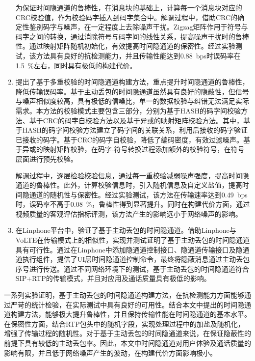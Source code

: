 \begin{conclusion}
\begin{enumerate}
    为保证时间隐通道的鲁棒性，在消息块的基础上，计算每一个消息块对应的CRC校验值，作为校验码字插入到码字集合中。解调过程中，借助CRC的确定性鉴别码字与噪声，在一定程度上去除噪声干扰。Zigzag矩阵作用于符号与码字之间的转换，通过消除符号与码字间的线性关系，提高噪声干扰时的鲁棒性。通过映射矩阵随机初始化，有效提高时间隐通道的保密性。经过实验测试，该方法具有良好的抗检测能力，并且传输性能达到{0.88\ bps}时误码率在{1.5\ \%}左右，同时具有极低的构建代价。
    
    \item
    提出了基于多重校验的时间隐通道构建方法，重点提升时间隐通道的鲁棒性，降低传输误码率。基于主动丢包的时间隐通道虽然具有良好的隐蔽性，但信号与噪声相似度较高，具有极低的信噪比，单一的数据校验与纠错无法满足实际需求。本方法的校验模式主要包含三部分，分别为基于HASH的码字间校验方法、基于CRC的码字自校验方法以及基于异或的映射矩阵校验方法。其中，基于HASH的码字间校验方法建立了码字间的关联关系，利用后接收的码字验证已接收的码字。基于CRC的码字自校验，降低了编码密度，有效过滤噪声。基于异或的映射矩阵校验，在码字-符号转换过程添加额外的校验符号，在符号层面进行预先校验。
    
    解调过程中，逐层检验校验信息，通过每一重校验减弱噪声强度，提高时间隐通道的鲁棒性。此外，计算校验信息时，引入随机信息及自定义盐值，提高时间隐通道的随机性与保密性。经过实验测试，该方法在传输速率达到{0.49\ bps}时，误码率不高于{0.08\ \%}，鲁棒性得到显著提升。同时在构建代价方面，通过视频质量的客观评估指标评测，该方法产生的影响远小于网络噪声的影响。

    \item
    在Linphone平台中，验证了基于主动丢包的时间隐通道。借助Linphone与VoLTE在传输模式上的相似性，实现并测试证明了基于主动丢包的时间隐通道具有可行性。通过在Linphone中添加隐通道控制接口、隐通道传输接口及隐通道执行组件，提供了UI层时间隐通道控制命令，最终将隐蔽消息通过主动丢包序号进行传送。通过不同网络环境下的测试，基于主动丢包的时间隐通道符合SIP+RTP的传输模式，并且对应用及通话质量具有极低的影响。
\end{enumerate}

一系列实验证明，基于主动丢包的时间隐通道构建方法，在抗检测能力方面能够通过严苛的统计检验，在实际测试中具有良好的可用性。结合本文中提出的时间隐通道构建方法，能够极大提升鲁棒性，并且保持传输性能在时间隐通道的基本水平。在保密性方面，结合RTP包头中的随机字段，实现处理过程中的加盐及随机化，增强了传输过程的随机性。对于基于主动丢包的时间隐通道来说，在保证隐蔽性的前提下具有较低的主动丢包率。因此，本文中时间隐通道对用户体验及通话质量的影响有限，并且低于网络噪声产生的波动，在构建代价方面影响极小。


\end{conclusion}
